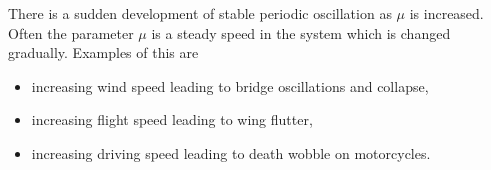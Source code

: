 \begin{enumerate}
		There is a sudden development of stable periodic oscillation as $\mu  $ is increased. Often the parameter $\mu $ is a steady speed in the system which is changed gradually. Examples of this are 
		\begin{itemize}
			\item increasing wind speed leading to bridge oscillations and collapse,
			\item increasing flight speed leading to wing flutter,
			\item increasing driving speed leading to death wobble on motorcycles.
		\end{itemize}
		
\end{enumerate}

